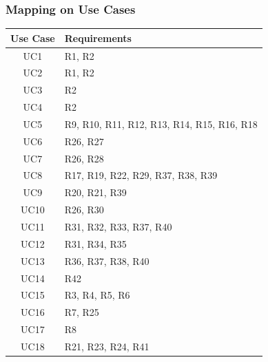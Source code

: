\subsubsection{Mapping on Use Cases}
\begin{center}
    \begin{tabular}{ |c|m{9cm}| }
        \hline
        \textbf{Use Case} & \textbf{Requirements} \\
        \hline
        UC1 & R1, R2 \\
        UC2 & R1, R2 \\
        UC3 & R2 \\
        UC4 & R2 \\
        UC5 & R9, R10, R11, R12, R13, R14, R15, R16, R18 \\
        UC6 & R26, R27 \\
        UC7 & R26, R28 \\
        UC8 & R17, R19, R22, R29, R37, R38, R39 \\
        UC9 & R20, R21, R39 \\
        UC10 & R26, R30 \\
        UC11 & R31, R32, R33, R37, R40 \\
        UC12 & R31, R34, R35 \\
        UC13 & R36, R37, R38, R40 \\
        UC14 & R42 \\
        UC15 & R3, R4, R5, R6 \\
        UC16 & R7, R25 \\
        UC17 & R8 \\
        UC18 & R21, R23, R24, R41 \\
        \hline
    \end{tabular}
\end{center}

